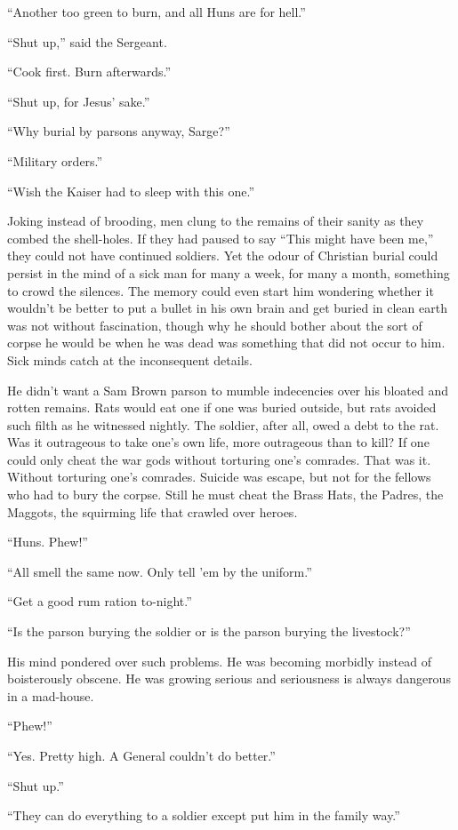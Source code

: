 ``Another too green to burn, and all Huns are for hell.''

``Shut up,'' said the Sergeant.

``Cook first. Burn afterwards.''

``Shut up, for Jesus' sake.''

``Why burial by parsons anyway, Sarge?''

``Military orders.''

``Wish the Kaiser had to sleep with this one.''

Joking instead of brooding, men clung to the remains of their sanity as they combed the shell-holes. If they had paused to say ``This might have been me,'' they could not have continued soldiers. Yet the odour of Christian burial could persist in the mind of a sick man for many a week, for many a month, something to crowd the silences. The memory could even start him wondering whether it wouldn't be better to put a bullet in his own brain and get buried in clean earth was not without fascination, though why he should bother about the sort of corpse he would be when he was dead was something that did not occur to him. Sick minds catch at the inconsequent details.

He didn't want a Sam Brown parson to mumble indecencies over his bloated and rotten remains. Rats would eat one if one was buried outside, but rats avoided such filth as he witnessed nightly. The soldier, after all, owed a debt to the rat. Was it outrageous to take one's own life, more outrageous than to kill? If one could only cheat the war gods without torturing one's comrades. That was it. Without torturing one's comrades. Suicide was escape, but not for the fellows who had to bury the corpse. Still he must cheat the Brass Hats, the Padres, the Maggots, the squirming  life that crawled over heroes.

``Huns. Phew!''

``All smell the same now. Only tell 'em by the uniform.''

``Get a good rum ration to-night.''

``Is the parson burying the soldier or is the parson burying the livestock?''

His mind pondered over such problems. He was becoming morbidly instead of boisterously obscene. He was growing serious and seriousness is always dangerous in a mad-house.

``Phew!''

``Yes. Pretty high. A General couldn't do better.''

``Shut up.''

``They can do everything to a soldier except put him in the family way.''


